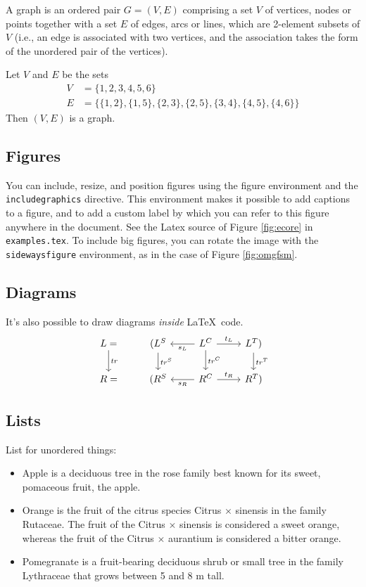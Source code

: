 \begin{mydef}
A graph is an ordered pair $G = (V, E)$ comprising a set $V$ of vertices, nodes or points together with a set $E$ of edges, arcs or lines, which are 2-element subsets of $V$ (i.e., an edge is associated with two vertices, and the association takes the form of the unordered pair of the vertices).
\end{mydef}

\begin{myexamp}
Let $V$ and $E$ be the sets
\begin{align*}
V &= \{1, 2, 3, 4, 5, 6\} \\
E &= \{\{1, 2\}, \{1, 5\}, \{2, 3\}, \{2, 5\}, \{3, 4\}, \{4, 5\}, \{4, 6\}\}
\end{align*}
Then $(V,E)$ is a graph.
\end{myexamp}

\subsection{Figures}
\label{sec:fig}
You can include, resize, and position figures using the figure environment and the \texttt{includegraphics} directive. This environment makes it possible to add captions to a figure, and to add a custom label by which you can refer to this figure anywhere in the document. See the Latex source of Figure \ref{fig:ecore} in \texttt{examples.tex}. To include big figures, you can rotate the image with the \texttt{sidewaysfigure} environment, as in the case of Figure \ref{fig:omgfsm}.


\subsection{Diagrams}
It's also possible to draw diagrams \textit{inside} \LaTeX\ code.
\[
\begin{tikzcd}
L\arrow{d}{tr} = & (L^S \arrow{d}{tr^S} &   \arrow{l}{s_L}  L^C\arrow{d}{tr^C} \arrow{r}{t_L} & L^T \arrow{d}{tr^T}) \\
R = & (R^S & \arrow{l}{s_R} R^C \arrow{r}{t_R} & R^T)
\end{tikzcd}
\]

\clearpage
\subsection{Lists}
List for unordered things:
\begin{itemize}
\item Apple is a deciduous tree in the rose family best known for its sweet, pomaceous fruit, the apple.
\item Orange is the fruit of the citrus species Citrus $\times$ sinensis in the family Rutaceae. The fruit of the Citrus $\times$ sinensis is considered a sweet orange, whereas the fruit of the Citrus $\times$ aurantium is considered a bitter orange.
\item Pomegranate is a fruit-bearing deciduous shrub or small tree in the family Lythraceae that grows between 5 and 8 m tall.
\end{itemize}

